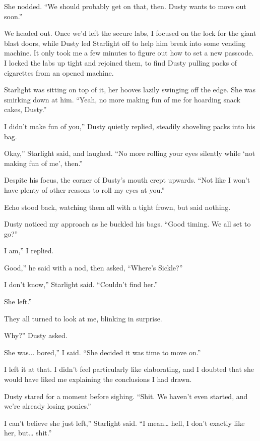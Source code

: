 She nodded. “We should probably get on that, then. Dusty wants to move out soon.”

We headed out. Once we’d left the secure labs, I focused on the lock for the giant blast doors, while Dusty led Starlight off to help him break into some vending machine. It only took me a few minutes to figure out how to set a new passcode. I locked the labs up tight and rejoined them, to find Dusty pulling packs of cigarettes from an opened machine.

Starlight was sitting on top of it, her hooves lazily swinging off the edge. She was smirking down at him. “Yeah, no more making fun of me for hoarding snack cakes, Dusty.”

\leavevmode{}I didn’t make fun of you,” Dusty quietly replied, steadily shoveling packs into his bag.

\leavevmode{}Okay,” Starlight said, and laughed. “No more rolling your eyes silently while ‘not making fun of me’, then.”

Despite his focus, the corner of Dusty’s mouth crept upwards. “Not like I won’t have plenty of other reasons to roll my eyes at you.”

Echo stood back, watching them all with a tight frown, but said nothing.

Dusty noticed my approach as he buckled his bags. “Good timing. We all set to go?”

\leavevmode{}I am,” I replied.

\leavevmode{}Good,” he said with a nod, then asked, “Where’s Sickle?”

\leavevmode{}I don’t know,” Starlight said. “Couldn’t find her.”

\leavevmode{}She left.”

They all turned to look at me, blinking in surprise.

\leavevmode{}Why?” Dusty asked.

\leavevmode{}She was... bored,” I said. “She decided it was time to move on.”

I left it at that. I didn’t feel particularly like elaborating, and I doubted that she would have liked me explaining the conclusions I had drawn.

Dusty stared for a moment before sighing. “Shit. We haven’t even started, and we’re already losing ponies.”

\leavevmode{}I can’t believe she just left,” Starlight said. “I mean… hell, I don’t exactly like her, but… shit.”

